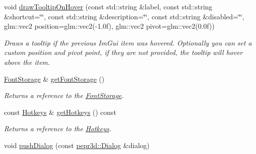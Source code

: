 \begin{DoxyCompactItemize}
\mbox{\label{classpepr3d_1_1_main_application_a82b879fdae70b8d0093c55c29bac2e5b}} 
void \mbox{\hyperlink{classpepr3d_1_1_main_application_a82b879fdae70b8d0093c55c29bac2e5b}{draw\+Tooltip\+On\+Hover}} (const std\+::string \&label, const std\+::string \&shortcut=\char`\"{}\char`\"{}, const std\+::string \&description=\char`\"{}\char`\"{}, const std\+::string \&disabled=\char`\"{}\char`\"{}, glm\+::vec2 position=glm\+::vec2(-\/1.\+0f), glm\+::vec2 pivot=glm\+::vec2(0.\+0f))
\begin{DoxyCompactList}\small\item\em Draws a tooltip if the previous Im\+Gui item was hovered. Optionally you can set a custom position and pivot point, if they are not provided, the tooltip will hover above the item. \end{DoxyCompactList}\item 
\mbox{\label{classpepr3d_1_1_main_application_ae60f75eac8ad5d0ffda1541122c713a0}} 
\mbox{\hyperlink{classpepr3d_1_1_font_storage}{Font\+Storage}} \& \mbox{\hyperlink{classpepr3d_1_1_main_application_ae60f75eac8ad5d0ffda1541122c713a0}{get\+Font\+Storage}} ()
\begin{DoxyCompactList}\small\item\em Returns a reference to the \mbox{\hyperlink{classpepr3d_1_1_font_storage}{Font\+Storage}}. \end{DoxyCompactList}\item 
\mbox{\label{classpepr3d_1_1_main_application_a21f4278d6d389508667b7a6a7b984c8b}} 
const \mbox{\hyperlink{classpepr3d_1_1_hotkeys}{Hotkeys}} \& \mbox{\hyperlink{classpepr3d_1_1_main_application_a21f4278d6d389508667b7a6a7b984c8b}{get\+Hotkeys}} () const
\begin{DoxyCompactList}\small\item\em Returns a reference to the \mbox{\hyperlink{classpepr3d_1_1_hotkeys}{Hotkeys}}. \end{DoxyCompactList}\item 
\mbox{\label{classpepr3d_1_1_main_application_adafee6ac798a97a338f1de8b5cece5d4}} 
void \mbox{\hyperlink{classpepr3d_1_1_main_application_adafee6ac798a97a338f1de8b5cece5d4}{push\+Dialog}} (const \mbox{\hyperlink{classpepr3d_1_1_dialog}{pepr3d\+::\+Dialog}} \&dialog)

\end{DoxyCompactItemize}
